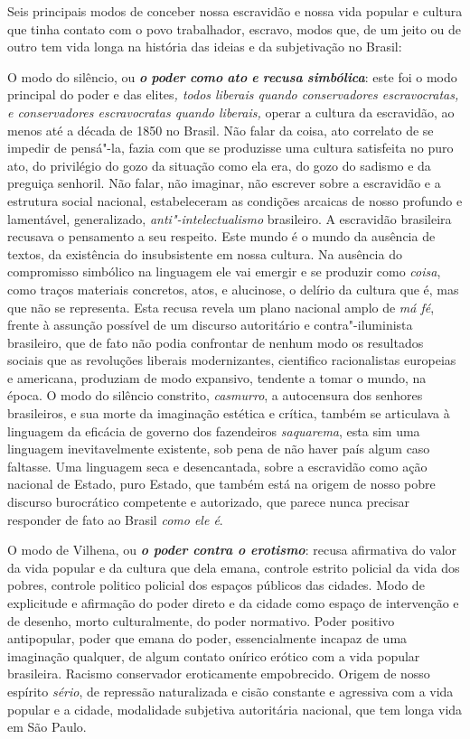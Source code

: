 Seis principais modos de conceber nossa escravidão e nossa vida popular
e cultura que tinha contato com o povo trabalhador, escravo, modos que,
de um jeito ou de outro tem vida longa na história das ideias e da
subjetivação no Brasil:

O modo do silêncio, ou \emph{\textbf{o} \textbf{poder} \textbf{como}
\textbf{ato} \textbf{e} \textbf{recusa} \textbf{simbólica}}: este foi o
modo principal do poder e das elites\emph{, todos liberais quando
conservadores escravocratas, e conservadores escravocratas quando
liberais,} operar a cultura da escravidão, ao menos até a década de 1850
no Brasil. Não falar da coisa, ato correlato de se impedir de pensá"-la,
fazia com que se produzisse uma cultura satisfeita no puro ato, do
privilégio do gozo da situação como ela era, do gozo do sadismo e da
preguiça senhoril. Não falar, não imaginar, não escrever sobre a
escravidão e a estrutura social nacional, estabeleceram as condições
arcaicas de nosso profundo e lamentável, generalizado,
\emph{anti"-intelectualismo} brasileiro. A escravidão brasileira recusava
o pensamento a seu respeito. Este mundo é o mundo da ausência de textos,
da existência do insubsistente em nossa cultura. Na ausência do
compromisso simbólico na linguagem ele vai emergir e se produzir como
\emph{coisa}, como traços materiais concretos, atos, e alucinose, o
delírio da cultura que é, mas que não se representa. Esta recusa revela
um plano nacional amplo de \emph{má fé}, frente à assunção possível de
um discurso autoritário e contra"-iluminista brasileiro, que de fato não
podia confrontar de nenhum modo os resultados sociais que as revoluções
liberais modernizantes, cientifico racionalistas europeias e americana,
produziam de modo expansivo, tendente a tomar o mundo, na época. O modo
do silêncio constrito, \emph{casmurro}, a autocensura dos senhores
brasileiros, e sua morte da imaginação estética e crítica, também se
articulava à linguagem da eficácia de governo dos fazendeiros
\emph{saquarema}, esta sim uma linguagem inevitavelmente existente, sob
pena de não haver país algum caso faltasse. Uma linguagem seca e
desencantada, sobre a escravidão como ação nacional de Estado, puro
Estado, que também está na origem de nosso pobre discurso burocrático
competente e autorizado, que parece nunca precisar responder de fato ao
Brasil \emph{como ele é}.

O modo de Vilhena, ou \emph{\textbf{o poder contra o erotismo}}: recusa
afirmativa do valor da vida popular e da cultura que dela emana,
controle estrito policial da vida dos pobres, controle politico policial
dos espaços públicos das cidades. Modo de explicitude e afirmação do
poder direto e da cidade como espaço de intervenção e de desenho, morto
culturalmente, do poder normativo. Poder positivo antipopular, poder que
emana do poder, essencialmente incapaz de uma imaginação qualquer, de
algum contato onírico erótico com a vida popular brasileira. Racismo
conservador eroticamente empobrecido. Origem de nosso espírito
\emph{sério}, de repressão naturalizada e cisão constante e agressiva
com a vida popular e a cidade, modalidade subjetiva autoritária
nacional, que tem longa vida em São Paulo.

